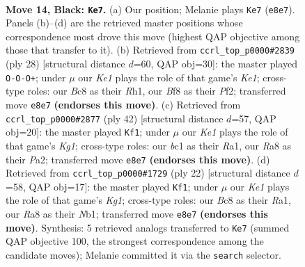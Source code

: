 \documentclass[11pt]{article}
\begin{document}
\clearpage

\begin{figure}[p]\centering
\begin{subfigure}{0.46\textwidth}\centering
\resizebox{\linewidth}{!}{%
\newchessgame
\chessboard[
  setfen={r1b1kb1r/p1p2p1p/2p3p1/8/5P1P/8/PPP3R1/RNB1K3 b Q - 0 14},
  showmover=false,
  pgfstyle=straightmove, color=movearrow, markmove={e8-e7}
]}
\caption{}
\end{subfigure}\hfill
\begin{subfigure}{0.46\textwidth}\centering
\resizebox{\linewidth}{!}{%
\newchessgame
\chessboard[
  setfen={r2k3r/p4ppp/2p1b3/8/4p3/2P1B1P1/P3PP1P/R3K2R w KQ - 2 15},
  showmover=false,
  pgfstyle=straightmove, color=movearrow, markmove={e1-c1}
]}
\caption{}
\end{subfigure}
\\[4pt]
\begin{subfigure}{0.46\textwidth}\centering
\resizebox{\linewidth}{!}{%
\newchessgame
\chessboard[
  setfen={2r1r3/pp3p1k/7p/2np2p1/8/2B1P3/PP3PPP/R1R3K1 w - - 3 22},
  showmover=false,
  pgfstyle=straightmove, color=movearrow, markmove={g1-f1}
]}
\caption{}
\end{subfigure}\hfill
\begin{subfigure}{0.46\textwidth}\centering
\resizebox{\linewidth}{!}{%
\newchessgame
\chessboard[
  setfen={r3k1nr/p1p2ppp/2p5/2b5/4P3/8/PP3PPP/RNBR2K1 w kq - 0 12},
  showmover=false,
  pgfstyle=straightmove, color=movearrow, markmove={g1-f1}
]}
\caption{}
\end{subfigure}
\caption{\textbf{Move 14, Black: \texttt{Ke7}.} (a) Our position; Melanie plays \texttt{Ke7} (\texttt{e8e7}). Panels (b)--(d) are the retrieved master positions whose correspondence most drove this move (highest QAP objective among those that transfer to it). (b) Retrieved from \texttt{ccrl\_top\_p0000\#2839} (ply 28) [structural distance $d$=60, QAP obj=30]: the master played \texttt{O-O-O+}; under $\mu$ our \emph{Ke1} plays the role of that game's \emph{Ke1}; cross-type roles: our \emph{B}c8 as their \emph{R}h1, our \emph{B}f8 as their \emph{P}f2; transferred move \texttt{e8e7} \textbf{(endorses this move)}. (c) Retrieved from \texttt{ccrl\_top\_p0000\#2877} (ply 42) [structural distance $d$=57, QAP obj=20]: the master played \texttt{Kf1}; under $\mu$ our \emph{Ke1} plays the role of that game's \emph{Kg1}; cross-type roles: our \emph{b}c1 as their \emph{R}a1, our \emph{R}a8 as their \emph{P}a2; transferred move \texttt{e8e7} \textbf{(endorses this move)}. (d) Retrieved from \texttt{ccrl\_top\_p0000\#1729} (ply 22) [structural distance $d$=58, QAP obj=17]: the master played \texttt{Kf1}; under $\mu$ our \emph{Ke1} plays the role of that game's \emph{Kg1}; cross-type roles: our \emph{B}c8 as their \emph{R}a1, our \emph{R}a8 as their \emph{N}b1; transferred move \texttt{e8e7} \textbf{(endorses this move)}. Synthesis: 5 retrieved analogs transferred to \texttt{Ke7} (summed QAP objective 100, the strongest correspondence among the candidate moves); Melanie committed it via the \texttt{search} selector.}
\label{fig:thought-m27}
\end{figure}
\end{document}
